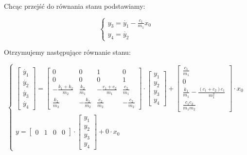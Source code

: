 \documentclass[12pt]{article}
\begin{document}
Chcąc przejść do równania stanu podstawiamy:

\begin{equation*}
	\begin{cases}
		y_3= \dot{y_1}-\frac{c_1}{m_1}x_0
								\\
		y_4=	\dot{y_2}
								
	\end{cases}
\end{equation*}

Otrzymujemy następujące równanie stanu:

\begin{equation}
	\begin{cases}
		\begin{bmatrix}
			\dot{y_1} \\
			\dot{y_2} \\
			\dot{y_3} \\
			\dot{y_4}
		\end{bmatrix} =	
		\begin{bmatrix}
			0 & 0 & 1 & 0 \\
			0 & 0 & 0 & 1 \\
			-\frac{k_1+k_2}{m_2} &
			\frac{k_2}{m_1} &
			-\frac{c_1+c_2}{m_1} &
			\frac{c_2}{m_1}\\
			\frac{k_2}{m_2} &
			-\frac{k_2}{m_2} &
			\frac{c_2}{m_2} &
			-\frac{c_2}{m_2}
		\end{bmatrix} \cdot
		\begin{bmatrix}
			y_1 \\
			y_2 \\
			y_3 \\
			y_4
		\end{bmatrix} +
		\begin{bmatrix}
			\frac{c_1}{m_1} \\
			0 \\
			\frac{k_1}{m_1}-\frac{(c_1+c_2)c_1}{m_1^2} \\
			\frac{c_1c_2}{m_1m_2}
		\end{bmatrix} \cdot
		x_0
		\\%
		y =
		\begin{bmatrix}
			0 & 1 & 0 & 0
		\end{bmatrix} \cdot
		\begin{bmatrix}
			y_1 \\
			y_2 \\
			y_3 \\
			y_4
		\end{bmatrix} +
		0 \cdot x_0
	\end{cases}
	\label{equ:rstanu}
\end{equation} 
 
\end{document}
